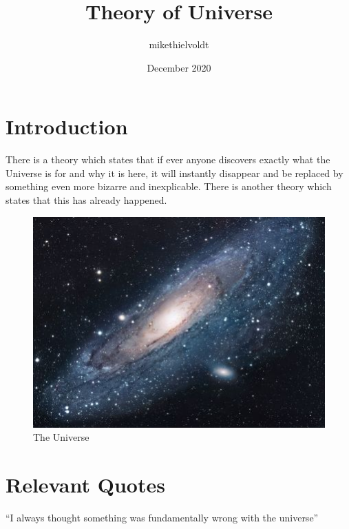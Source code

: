 \documentclass{article}
\title{Theory of Universe}
\author{mikethielvoldt }
\date{December 2020}
\begin{document}
\maketitle

\section{Introduction}
There is a theory which states that if ever anyone discovers exactly what the Universe is for and why it is here, it will instantly disappear and be replaced by something even more bizarre and inexplicable.
There is another theory which states that this has already happened.

\begin{figure}[h!]
\centering
\includegraphics[scale=1.7]{universe}
\caption{The Universe}
\label{fig:universe}
\end{figure}

\section{Relevant Quotes}
``I always thought something was fundamentally wrong with the universe'' \citep{adams1995hitchhiker}



\end{document}
